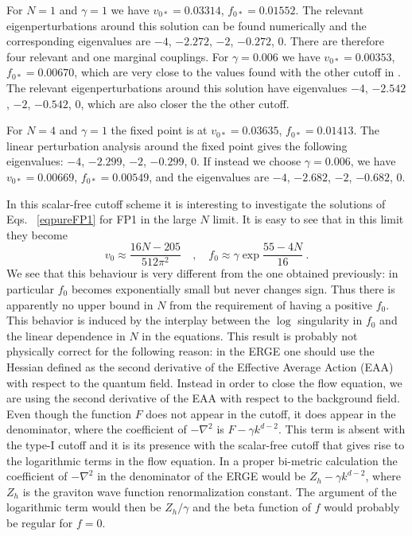 \documentclass[11pt]{book} %
\newcommand{\be}{\begin{equation}}
\newcommand{\ee}{\end{equation}}
\begin{document}
For $N=1$ and $\gamma=1$ we have $v_{0*}=0.03314$, $f_{0*}=0.01552$.
The relevant eigenperturbations around this solution
can be found numerically and the corresponding eigenvalues are
$-4$, $-2.272$, $-2$, $-0.272$, $0$.
There are therefore four relevant and one marginal couplings.
For $\gamma=0.006$ we have $v_{0*}=0.00353$, $f_{0*}=0.00670$,
which are very close to the values found with the other cutoff in \cite{pv1}.
The relevant eigenperturbations around this solution
have eigenvalues $-4$, $-2.542$, $-2$, $-0.542$, $0$,
which are also closer the the other cutoff.

For $N=4$ and $\gamma=1$ the fixed point is at $v_{0*}=0.03635$, $f_{0*}=0.01413$.
The linear perturbation analysis around the fixed point gives the following eigenvalues: $-4$, $-2.299$, $-2$, $-0.299$, $0$.
If instead we choose $\gamma=0.006$, we have $v_{0*}=0.00669$, $f_{0*}=0.00549$,
and the eigenvalues are $-4$, $-2.682$, $-2$, $-0.682$, $0$.

In this scalar-free cutoff scheme it is interesting to investigate the solutions of Eqs. ~\eqref{eqpureFP1} for FP1 in the large $N$ limit.
It is easy to see that in this limit they become
\be
v_0\approx \frac{16N-205}{512\pi^2} \quad , \quad
f_0\approx \gamma\exp{\frac{55-4N}{16}}\ .
\ee
We see that this behaviour is very different from the one obtained previously: in particular $f_0$ becomes exponentially small
but never changes sign.
Thus there is apparently no upper bound in $N$ from the requirement of having a positive $f_0$. This behavior is induced by the interplay between the $\log$ singularity in $f_0$ and the linear dependence in $N$ in the equations.
This result is probably not physically correct for the following
reason: in the ERGE one should use the Hessian defined as the second derivative of the Effective Average Action (EAA) with respect to the quantum field.
Instead in order to close the flow equation,
we are using the second derivative of the
EAA with respect to the background field.
Even though the function $F$ does not appear in the cutoff,
it does appear in the denominator, where the coefficient
of $-\nabla^2$ is $F-\gamma k^{d-2}$.
This term is absent with the type-I cutoff and
it is its presence with the scalar-free cutoff that gives rise
to the logarithmic terms in the flow equation.
In a proper bi-metric calculation the coefficient of
$-\nabla^2$ in the denominator of the ERGE
would be $Z_h-\gamma k^{d-2}$, where $Z_h$ is the graviton
wave function renormalization constant.
The argument of the logarithmic term would then be $Z_h/\gamma$
and the beta function of $f$ would probably be regular for $f=0$.
\end{document}
